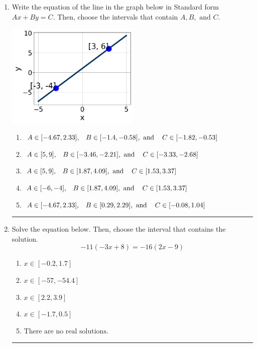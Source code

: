 \documentclass[14pt]{extbook}
\newcommand{\litem}[1]{\item#1\hspace*{-1cm}\rule{\textwidth}{0.4pt}}
\begin{document}
\begin{enumerate}
\litem{
Write the equation of the line in the graph below in Standard form $Ax+By=C$. Then, choose the intervals that contain $A, B, \text{ and } C$.
\begin{center}
    \includegraphics[width=0.5\textwidth]{../Figures/linearGraphToStandardB.png}
\end{center}
\begin{enumerate}[label=\Alph*.]
\item \( A \in [-4.67, 2.33], \hspace{3mm} B \in [-1.4, -0.58], \text{ and } \hspace{3mm} C \in [-1.82, -0.53] \)
\item \( A \in [5, 9], \hspace{3mm} B \in [-3.46, -2.21], \text{ and } \hspace{3mm} C \in [-3.33, -2.68] \)
\item \( A \in [5, 9], \hspace{3mm} B \in [1.87, 4.09], \text{ and } \hspace{3mm} C \in [1.53, 3.37] \)
\item \( A \in [-6, -4], \hspace{3mm} B \in [1.87, 4.09], \text{ and } \hspace{3mm} C \in [1.53, 3.37] \)
\item \( A \in [-4.67, 2.33], \hspace{3mm} B \in [0.29, 2.29], \text{ and } \hspace{3mm} C \in [-0.08, 1.04] \)

\end{enumerate} }
\litem{
Solve the equation below. Then, choose the interval that contains the solution.\[ -11(-3x + 8) = -16(2x -9) \]\begin{enumerate}[label=\Alph*.]
\item \( x \in [-0.2, 1.7] \)
\item \( x \in [-57, -54.4] \)
\item \( x \in [2.2, 3.9] \)
\item \( x \in [-1.7, 0.5] \)
\item \( \text{There are no real solutions.} \)


\end{enumerate}}
\end{enumerate}
\end{document}
